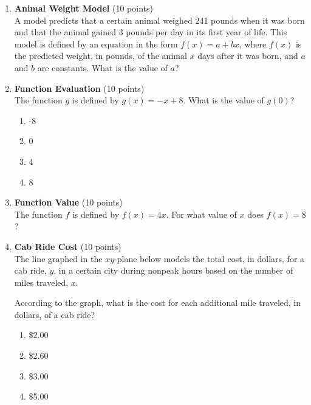 \begin{enumerate}
  \newpage


  \item \textbf{Animal Weight Model} (10 points)\\
  A model predicts that a certain animal weighed 241 pounds when it was born and that the animal gained 3 pounds per day in its first year of life. This model is defined by an equation in the form $f(x)=a+bx$, where $f(x)$ is the predicted weight, in pounds, of the animal $x$ days after it was born, and $a$ and $b$ are constants. What is the value of $a$?
  \begin{subanswer}
  \end{subanswer}

  \item \textbf{Function Evaluation} (10 points)\\
  The function $g$ is defined by $g(x)=-x+8$. What is the value of $g(0)$?\\
  \begin{enumerate}[label=(\Alph*)]
    \item -8
    \item 0
    \item 4
    \item 8
  \end{enumerate}
  \begin{subanswer}
  \end{subanswer}

  \item \textbf{Function Value} (10 points)\\
  The function $f$ is defined by $f(x)=4x$. For what value of $x$ does $f(x)=8$?
  \begin{subanswer}
  \end{subanswer}

  \newpage

  \item \textbf{Cab Ride Cost} (10 points)\\
  The line graphed in the $xy$-plane below models the total cost, in dollars, for a cab ride, $y$, in a certain city during nonpeak hours based on the number of miles traveled, $x$.


  According to the graph, what is the cost for each additional mile traveled, in dollars, of a cab ride?\\
  \begin{enumerate}[label=(\Alph*)]
    \item \$2.00
    \item \$2.60
    \item \$3.00
    \item \$5.00
  \end{enumerate}
  \begin{subanswer}
  \end{subanswer}


\end{enumerate}
